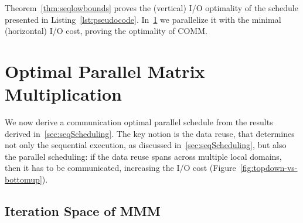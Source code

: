 \documentclass[sigplan,review,anonymous,10pt]{acmart}\settopmatter{printfolios=true,printccs=false,printacmref=false}
\newcommand\greg[1]{\textcolor{blue}{[Greg: #1]}}
\newcommand\mac[1]{\textcolor{red}{[Mac: #1]}}
\newcommand{\macb}[1]{\textbf{\textsf{#1}}}
\begin{document}
Theorem~\ref{thm:seqlowbounds} proves the (vertical) I/O 
optimality of 
the schedule presented in Listing~\ref{lst:pseudocode}. 
In~\cref{sec:parOptimality} we parallelize it with the minimal (horizontal) I/O 
cost, proving the optimality of COMM.
%
%
%

\section{Optimal Parallel Matrix Multiplication}
\label{sec:parOptimality}

We now derive a communication optimal parallel schedule from the results
derived in~\cref{sec:seqScheduling}. The key notion is the data reuse, that
determines not only the sequential execution, as discussed
in~\cref{sec:seqScheduling}, but also the parallel 
scheduling: if the data reuse spans across multiple local domains, then it has 
to be communicated, increasing the I/O cost 
(Figure~\ref{fig:topdown-vs-bottomup}).

\subsection{Iteration Space of MMM}
\label{sec:iterationSpace}
%
%
\end{document}

